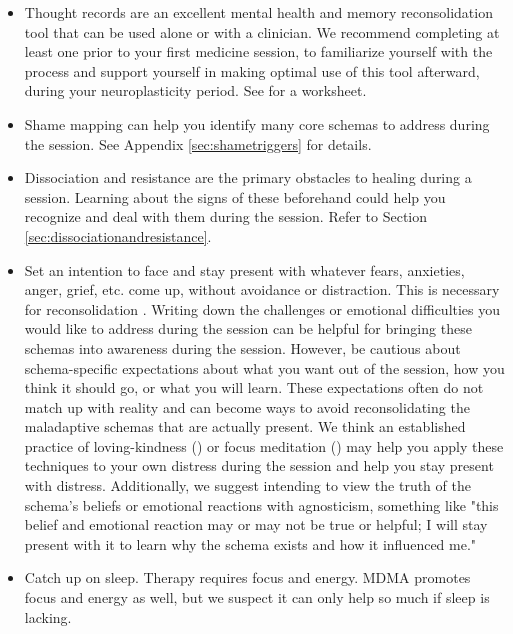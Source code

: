 \documentclass[12pt,letterpaper]{book}
\begin{document}
\begin{itemize}
    \item {} Thought records are an excellent mental health and memory reconsolidation tool that can be used alone or with a clinician. We recommend completing at least one prior to your first medicine session, to familiarize yourself with the process and support yourself in making optimal use of this tool afterward, during your neuroplasticity period. See \textcite{harperThought} for a worksheet.
    \item Shame mapping can help you identify many core schemas to address during the session. See Appendix \ref{sec:shametriggers} for details.
    \item Dissociation and resistance are the primary obstacles to healing during a session. Learning about the signs of these beforehand could help you recognize and deal with them during the session. Refer to Section \ref{sec:dissociationandresistance}.
    \item Set an intention to face and stay present with whatever fears, anxieties, anger, grief, etc. come up, without avoidance or distraction. This is necessary for reconsolidation \cite{eckerUnlocking}. Writing down the challenges or emotional difficulties you would like to address during the session can be helpful for bringing these schemas into awareness during the session. However, be cautious about schema-specific expectations about what you want out of the session, how you think it should go, or what you will learn. These expectations often do not match up with reality and can become ways to avoid reconsolidating the maladaptive schemas that are actually present. We think an established practice of loving-kindness (\textcite{lkMeditation}) or focus meditation (\textcite{rain}) may help you apply these techniques to your own distress during the session and help you stay present with distress. Additionally, we suggest intending to view the truth of the schema's beliefs or emotional reactions with agnosticism, something like "this belief and emotional reaction may or may not be true or helpful; I will stay present with it to learn why the schema exists and how it influenced me."
    \item Catch up on sleep. Therapy requires focus and energy. MDMA promotes focus and energy as well, but we suspect it can only help so much if sleep is lacking.

\end{itemize}
\end{document}
